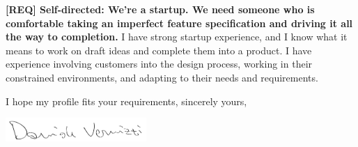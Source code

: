 \documentclass[a4paper,sans]{moderncv} %
\begin{document}
\textbf{[REQ] Self-directed: We’re a startup. We need someone who is comfortable taking an imperfect feature specification and driving it all the way to completion.}
I have strong startup experience, and I know what it means to work on draft ideas and complete them into a product. I have experience involving customers into the design process, working in their constrained environments, and adapting to their needs and requirements.

I hope my profile fits your requirements, sincerely yours,

\vspace{1.5em}

\includegraphics[width=0.4\textwidth]{firmaPenna}
\makeletterclosing %


\end{document}
